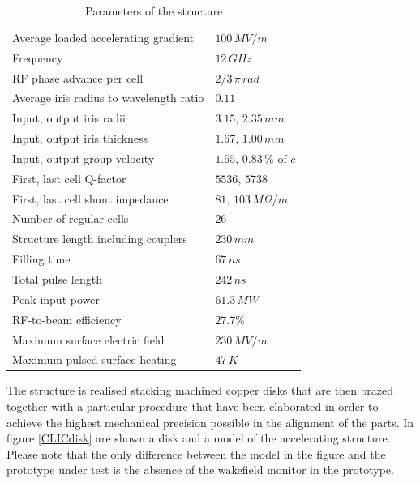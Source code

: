 \begin{table}[h]
  \centering
    \begin{tabular}{ l l  }
    \hline
    \hline
    Average loaded accelerating gradient			& $100\, MV/m$	\\
    Frequency								& $12 \, GHz$	\\        
    RF phase advance per cell					& $2/3 \, \pi \, rad$	\\       
    Average iris radius to wavelength ratio			& $0.11$	\\ 
    Input, output iris radii      					& $3.15, \, 2.35 \, mm$	\\
    Input, output iris thickness      				& $1.67, \, 1.00 \, mm$	\\
    Input, output group velocity					& $1.65, \, 0.83 \, \% \text{ of }c $	\\
    First, last cell Q-factor						& $5536,\,5738$\\
    First, last cell shunt impedance				& $81,\,103\, M\Omega / m$\\
    Number of regular cells						& $26$	\\   
    Structure length including couplers			& $230 \,mm$	\\   
    Filling time								& $67 \, ns$	\\               
    Total pulse length							& $242 \, ns$	\\      
    Peak input power 							& $61.3 \, MW$	\\        
    RF-to-beam efficiency						& $27.7 \%$	\\   
    Maximum surface electric field				& $230 \, MV/m$	\\           
    Maximum pulsed surface heating				& $47 \, K$	\\       
    \hline
    \hline
    \end{tabular}
  \caption{Parameters of the structure}
\label{TD26_param_1}
\end{table}

The structure is realised stacking machined copper disks that are then brazed together with a particular procedure that have been elaborated in order to achieve the highest mechanical precision possible in the alignment of the parts. In figure \ref{CLICdisk} are shown a disk and a model of the accelerating structure. Please note that the only difference between the model in the figure and the prototype under test is the absence of the wakefield monitor in the prototype. 

